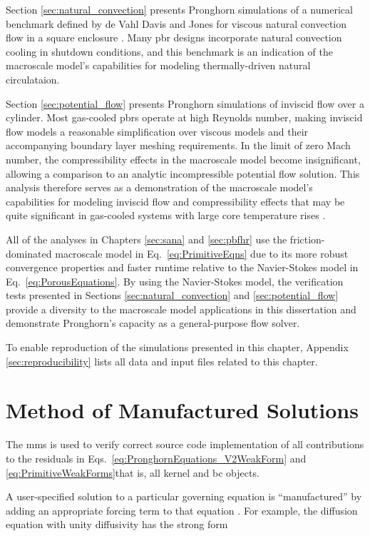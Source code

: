 Section \ref{sec:natural_convection} presents Pronghorn simulations of a numerical benchmark defined by de Vahl Davis and Jones for viscous natural convection flow in a square enclosure \cite{davis}. Many \gls{pbr} designs incorporate natural convection cooling in shutdown conditions, and this benchmark is an indication of the macroscale model's capabilities for modeling thermally-driven natural circulataion.

Section \ref{sec:potential_flow} presents Pronghorn simulations of inviscid flow over a cylinder. Most gas-cooled \glspl{pbr} operate at high Reynolds number, making inviscid flow models a reasonable simplification over viscous models and their accompanying boundary layer meshing requirements. In the limit of zero Mach number, the compressibility effects in the macroscale model become insignificant, allowing a comparison to an analytic incompressible potential flow solution. This analysis therefore serves as a demonstration of the macroscale model's capabilities for modeling inviscid flow and compressibility effects that may be quite significant in gas-cooled systems with large core temperature rises \cite{martineau}.

All of the analyses in Chapters \ref{sec:sana} and \ref{sec:pbfhr} use the friction-dominated macroscale model in Eq.\ \eqref{eq:PrimitiveEqns} due to its more robust convergence properties and faster runtime relative to the Navier-Stokes model in Eq.\ \eqref{eq:PorousEquations}. By using the Navier-Stokes model, the verification tests presented in Sections \ref{sec:natural_convection} and \ref{sec:potential_flow} provide a diversity to the macroscale model applications in this dissertation and demonstrate Pronghorn's capacity as a general-purpose flow solver.

To enable reproduction of the simulations presented in this chapter, Appendix \ref{sec:reproducibility} lists all data and input files related to this chapter.

\section{Method of Manufactured Solutions}
\label{sec:mms}

The \gls{mms} is used to verify correct source code implementation of all contributions to the residuals in Eqs.\ \eqref{eq:PronghornEquations_V2WeakForm} and \eqref{eq:PrimitiveWeakForms}\mdash that is, all kernel and \gls{bc} objects.

A user-specified solution to a particular governing equation is ``manufactured'' by adding an appropriate forcing term to that equation \cite{roache}. For example, the diffusion equation with unity diffusivity has the strong form

